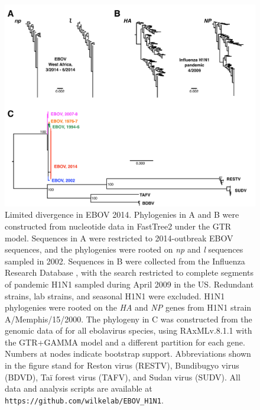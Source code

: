 \documentclass[11pt]{article}
\begin{document}
\clearpage
\begin{figure}[H]
	\centerline{\includegraphics[width=14cm]{ebov_trees_H1N1.pdf}}
	\caption{\label{ebov_flu} Limited divergence in EBOV 2014. Phylogenies in A and B were constructed from nucleotide data in FastTree2 \citep{FTT2} under the GTR model. Sequences in A were restricted to 2014-outbreak EBOV sequences, and the phylogenies were rooted on \emph{np} and \emph{l} sequences sampled in 2002. Sequences in B were collected from the Influenza Research Database \citep{ird}, with the search restricted to complete segments of pandemic H1N1 sampled during April 2009 in the US. Redundant strains, lab strains, and seasonal H1N1 were excluded. H1N1 phylogenies were rooted on the \emph{HA} and \emph{NP} genes from H1N1 strain A/Memphis/15/2000. The phylogeny in C was constructed from the genomic data of \citet{Gire2014} for all ebolavirus species, using RAxMLv.8.1.1 \citep{raxml} with the GTR+GAMMA model and a different partition for each gene. Numbers at nodes indicate bootstrap support. Abbreviations shown in the figure stand for Reston virus (RESTV), Bundibugyo virus (BDVD), Ta\"{i} forest virus (TAFV), and Sudan virus (SUDV). All data and analysis scripts are available at \texttt{https://github.com/wilkelab/EBOV\_H1N1}.
	}
\end{figure}
\end{document}
